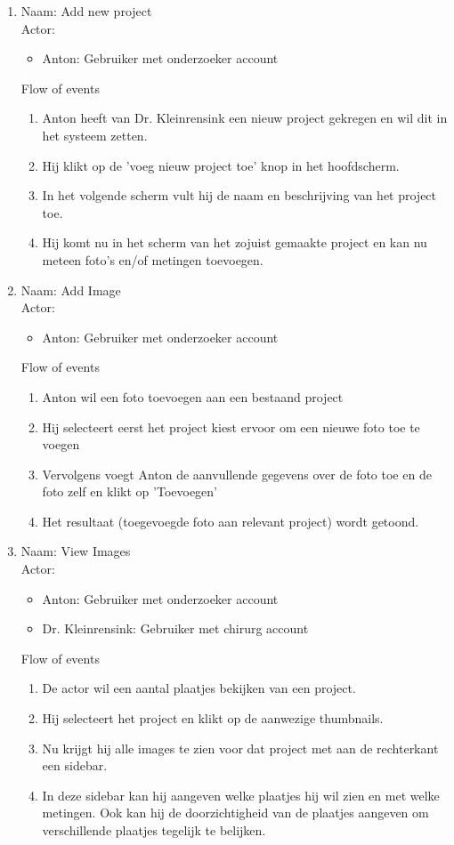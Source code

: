 \begin{enumerate}

\item   Naam: Add new project  \\
	Actor:
	\begin{itemize}
		\item Anton: Gebruiker met onderzoeker account
	\end{itemize}
	Flow of events
	\begin{enumerate}
		\item Anton heeft van Dr. Kleinrensink een nieuw project gekregen en wil dit in het systeem zetten.
		\item Hij klikt op de 'voeg nieuw project toe' knop in het hoofdscherm.
		\item In het volgende scherm vult hij de naam en beschrijving van het project toe.
		\item Hij komt nu in het scherm van het zojuist gemaakte project en kan nu meteen foto's en/of metingen toevoegen.
	\end{enumerate}


\item   Naam: Add Image \\
	Actor:
	\begin{itemize}
		\item Anton: Gebruiker met onderzoeker account
	\end{itemize}
	Flow of events
	\begin{enumerate}
        \item Anton wil een foto toevoegen aan een bestaand project
				\item Hij selecteert eerst het project kiest ervoor om een nieuwe foto toe te voegen
				\item Vervolgens voegt Anton de aanvullende gegevens over de foto toe en de foto zelf en klikt op 'Toevoegen' 
				\item Het resultaat (toegevoegde foto aan relevant project) wordt getoond.
    \end{enumerate}


\item  Naam: View Images  \\
	Actor:
	\begin{itemize}
		\item Anton: Gebruiker met onderzoeker account
		\item Dr. Kleinrensink: Gebruiker met chirurg account
	\end{itemize}
	Flow of events
	\begin{enumerate}
		\item De actor wil een aantal plaatjes bekijken van een project.
		\item Hij selecteert het project en klikt op de aanwezige thumbnails.
		\item Nu krijgt hij alle images te zien voor dat project met aan de rechterkant een sidebar.
		\item In deze sidebar kan hij aangeven welke plaatjes hij wil zien en met welke metingen. Ook kan hij de doorzichtigheid van de plaatjes aangeven om verschillende plaatjes tegelijk te belijken.
	\end{enumerate}



\end{enumerate}
